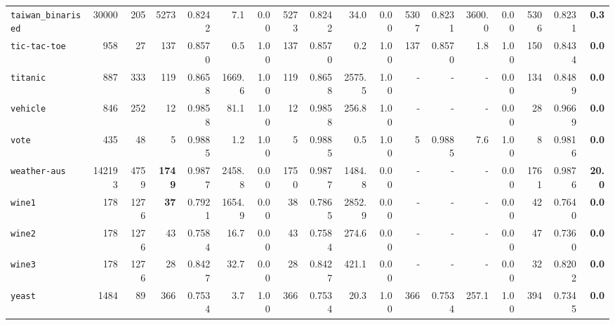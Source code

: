 \begin{tabular}{lccrrrrrrrrrrrrrrr}
\texttt{taiwan\_binarised} & \multicolumn{1}{r}{30000} & \multicolumn{1}{r}{205}  & 5273 & 0.8242 & 7.1 & 0.00 & 5273 & 0.8242 & 34.0 & 0.00 & 5307 & 0.8231 & 3600.0 & 0.00 & 5306 & 0.8231 & \textbf{0.3}\\
\texttt{tic-tac-toe} & \multicolumn{1}{r}{958} & \multicolumn{1}{r}{27}  & 137 & 0.8570 & 0.5 & 1.00 & 137 & 0.8570 & 0.2 & 1.00 & 137 & 0.8570 & 1.8 & 1.00 & 150 & 0.8434 & \textbf{0.0}\\
\texttt{titanic} & \multicolumn{1}{r}{887} & \multicolumn{1}{r}{333}  & 119 & 0.8658 & 1669.6 & 1.00 & 119 & 0.8658 & 2575.5 & 1.00 & - & - & - & 0.00 & 134 & 0.8489 & \textbf{0.0}\\
\texttt{vehicle} & \multicolumn{1}{r}{846} & \multicolumn{1}{r}{252}  & 12 & 0.9858 & 81.1 & 1.00 & 12 & 0.9858 & 256.8 & 1.00 & - & - & - & 0.00 & 28 & 0.9669 & \textbf{0.0}\\
\texttt{vote} & \multicolumn{1}{r}{435} & \multicolumn{1}{r}{48}  & 5 & 0.9885 & 1.2 & 1.00 & 5 & 0.9885 & 0.5 & 1.00 & 5 & 0.9885 & 7.6 & 1.00 & 8 & 0.9816 & \textbf{0.0}\\
\texttt{weather-aus} & \multicolumn{1}{r}{142193} & \multicolumn{1}{r}{4759}  & \textbf{1749} & 0.9877 & 2458.8 & 0.00 & 1750 & 0.9877 & 1484.8 & 0.00 & - & - & - & 0.00 & 1761 & 0.9876 & \textbf{20.0}\\
\texttt{wine1} & \multicolumn{1}{r}{178} & \multicolumn{1}{r}{1276}  & \textbf{37} & 0.7921 & 1654.9 & 0.00 & 38 & 0.7865 & 2852.9 & 0.00 & - & - & - & 0.00 & 42 & 0.7640 & \textbf{0.0}\\
\texttt{wine2} & \multicolumn{1}{r}{178} & \multicolumn{1}{r}{1276}  & 43 & 0.7584 & 16.7 & 0.00 & 43 & 0.7584 & 274.6 & 0.00 & - & - & - & 0.00 & 47 & 0.7360 & \textbf{0.0}\\
\texttt{wine3} & \multicolumn{1}{r}{178} & \multicolumn{1}{r}{1276}  & 28 & 0.8427 & 32.7 & 0.00 & 28 & 0.8427 & 421.1 & 0.00 & - & - & - & 0.00 & 32 & 0.8202 & \textbf{0.0}\\
\texttt{yeast} & \multicolumn{1}{r}{1484} & \multicolumn{1}{r}{89}  & 366 & 0.7534 & 3.7 & 1.00 & 366 & 0.7534 & 20.3 & 1.00 & 366 & 0.7534 & 257.1 & 1.00 & 394 & 0.7345 & \textbf{0.0}\\
\bottomrule
\end{tabular}
